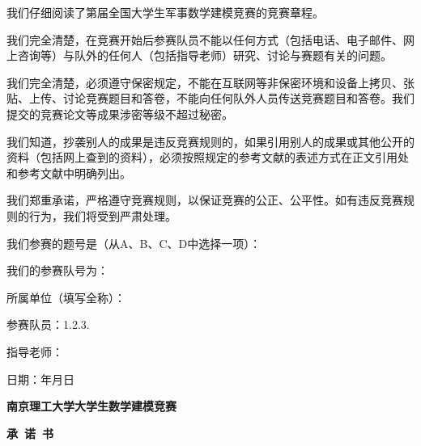 \documentclass{article}
\begin{document}
	\begin{spacing}{2.0}
		\fangsong

		我们仔细阅读了第届全国大学生军事数学建模竞赛的竞赛章程。

		我们完全清楚，在竞赛开始后参赛队员不能以任何方式（包括电话、电子邮件、网上咨询等）与队外的任何人（包括指导老师）研究、讨论与赛题有关的问题。

		我们完全清楚，必须遵守保密规定，不能在互联网等非保密环境和设备上拷贝、张贴、上传、讨论竞赛题目和答卷，不能向任何队外人员传送竞赛题目和答卷。我们提交的竞赛论文等成果涉密等级不超过秘密。

		我们知道，抄袭别人的成果是违反竞赛规则的，如果引用别人的成果或其他公开的资料（包括网上查到的资料），必须按照规定的参考文献的表述方式在正文引用处和参考文献中明确列出。

		我们郑重承诺，严格遵守竞赛规则，以保证竞赛的公正、公平性。如有违反竞赛规则的行为，我们将受到严肃处理。

		我们参赛的题号是（从A、B、C、D中选择一项）：\NumberProblem

		我们的参赛队号为：\NumberMilitaryMathModeling

		所属单位（填写全称）：\MembersUniversity

		参赛队员：1.\underline{\makebox[8\ccwd][c]{\MemberOne}}2.\underline{\makebox[8\ccwd][c]{\MemberTwo}}3.\underline{\makebox[8\ccwd][c]{\MemberThree}}

		指导老师：\underline{\makebox[20\ccwd][c]{\MemberTeacher}}
	\end{spacing}

	\begin{flushright}
		\fangsong

		日期：\Year 年\Month 月\Day 日
	\end{flushright}

	\restoregeometry
	\setcounter{page}{1}

\fi


\ifNJUSTMathModeling

	\thispagestyle{empty}

	\begin{center}
		\textbf{\Year 南京理工大学大学生数学建模竞赛}

		\vspace{2em}

		\textbf{承~诺~书}

		\vspace{1em}
	\end{center}
\end{document}
